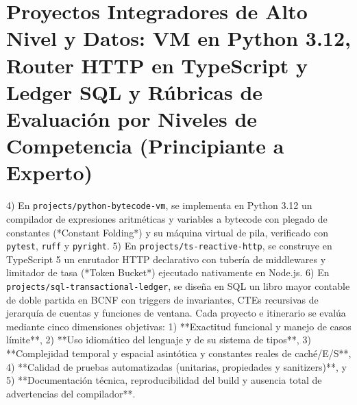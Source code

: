 \documentclass{book}
\begin{document}
\section{Proyectos Integradores de Alto Nivel y Datos: VM en Python 3.12, Router HTTP en TypeScript y Ledger SQL y Rúbricas de Evaluación por Niveles de Competencia (Principiante a Experto)}

4) En \texttt{projects/python-bytecode-vm}, se implementa en Python 3.12 un compilador de expresiones aritméticas y variables a bytecode con plegado de constantes (*Constant Folding*) y su máquina virtual de pila, verificado con \texttt{pytest}, \texttt{ruff} y \texttt{pyright}. 5) En \texttt{projects/ts-reactive-http}, se construye en TypeScript 5 un enrutador HTTP declarativo con tubería de middlewares y limitador de tasa (*Token Bucket*) ejecutado nativamente en Node.js. 6) En \texttt{projects/sql-transactional-ledger}, se diseña en SQL un libro mayor contable de doble partida en BCNF con triggers de invariantes, CTEs recursivas de jerarquía de cuentas y funciones de ventana.
Cada proyecto e itinerario se evalúa mediante cinco dimensiones objetivas: 1) **Exactitud funcional y manejo de casos límite**, 2) **Uso idiomático del lenguaje y de su sistema de tipos**, 3) **Complejidad temporal y espacial asintótica y constantes reales de caché/E/S**, 4) **Calidad de pruebas automatizadas (unitarias, propiedades y sanitizers)**, y 5) **Documentación técnica, reproducibilidad del build y ausencia total de advertencias del compilador**.
\end{document}
